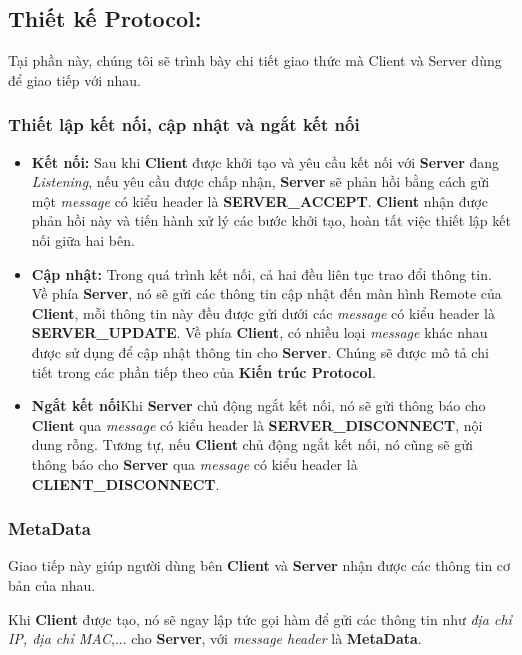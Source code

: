 \subsection{Thiết kế Protocol: }

Tại phần này, chúng tôi sẽ trình bày chi tiết giao thức mà Client và Server dùng để giao tiếp với nhau. 

\subsubsection{Thiết lập kết nối, cập nhật và ngắt kết nối}

\begin{itemize}
	\item \textbf{Kết nối: } Sau khi \textbf{Client} được khởi tạo và yêu cầu kết nối với \textbf{Server} đang \textit{Listening}, nếu yêu cầu được chấp nhận, \textbf{Server} sẽ phản hồi bằng cách gửi một \textit{message} có kiểu header là \textbf{SERVER\_ACCEPT}. \textbf{Client} nhận được phản hồi này và tiến hành xử lý các bước khởi tạo, hoàn tất việc thiết lập kết nối giữa hai bên.
	\item \textbf{Cập nhật: } Trong quá trình kết nối, cả hai đều liên tục trao đổi thông tin. Về phía \textbf{Server}, nó sẽ gửi các thông tin cập nhật đến màn hình Remote của \textbf{Client}, mỗi thông tin này đều được gửi dưới các \textit{message} có kiểu header là \textbf{SERVER\_UPDATE}. Về phía \textbf{Client}, có nhiều loại \textit{message} khác nhau được sử dụng để cập nhật thông tin cho \textbf{Server}. Chúng sẽ được mô tả chi tiết trong các phần tiếp theo của \textbf{Kiến trúc Protocol}.
	\item \textbf{Ngắt kết nối}Khi \textbf{Server} chủ động ngắt kết nối, nó sẽ gửi thông báo cho \textbf{Client} qua \textit{message} có kiểu header là \textbf{SERVER\_DISCONNECT}, nội dung rỗng. Tương tự, nếu \textbf{Client} chủ động ngắt kết nối, nó cũng sẽ gửi thông báo cho \textbf{Server} qua \textit{message} có kiểu header là \textbf{CLIENT\_DISCONNECT}.
\end{itemize}
	
\subsubsection{MetaData}

Giao tiếp này giúp người dùng bên \textbf{Client} và \textbf{Server} nhận được các thông tin cơ bản của nhau.

Khi \textbf{Client} được tạo, nó sẽ ngay lập tức gọi hàm để gửi các thông tin như \textit{địa chỉ IP, địa chỉ MAC},... cho \textbf{Server}, với \textit{message header} là \textbf{MetaData}.

